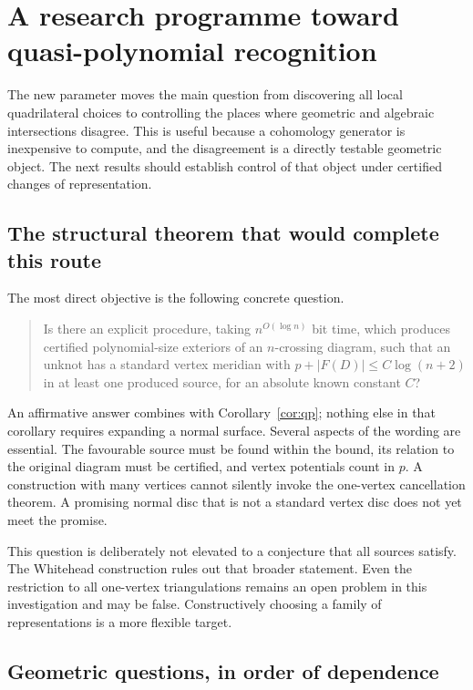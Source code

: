 \section{A research programme toward quasi-polynomial recognition}
\label{sec:research}

The new parameter moves the main question from discovering all local
quadrilateral choices to controlling the places where geometric and
algebraic intersections disagree. This is useful because a cohomology
generator is inexpensive to compute, and the disagreement is a directly
testable geometric object. The next results should establish control of
that object under certified changes of representation.

\subsection{The structural theorem that would complete this route}

The most direct objective is the following concrete question.

\begin{quote}
Is there an explicit procedure, taking $n^{O(\log n)}$ bit time, which
produces certified polynomial-size exteriors of an $n$-crossing diagram,
such that an unknot has a standard vertex meridian with
$p+|F(D)|\le C\log(n+2)$ in at least one produced source, for an absolute
known constant $C$?
\end{quote}

An affirmative answer combines with Corollary~\ref{cor:qp}; nothing else
in that corollary requires expanding a normal surface. Several aspects
of the wording are essential. The favourable source must be found within
the bound, its relation to the original diagram must be certified, and
vertex potentials count in $p$. A construction with many vertices cannot
silently invoke the one-vertex cancellation theorem. A promising normal
disc that is not a standard vertex disc does not yet meet the promise.

This question is deliberately not elevated to a conjecture that all
sources satisfy. The Whitehead construction rules out that broader
statement. Even the restriction to all one-vertex triangulations remains
an open problem in this investigation and may be false. Constructively
choosing a family of representations is a more flexible target.

\subsection{Geometric questions, in order of dependence}

